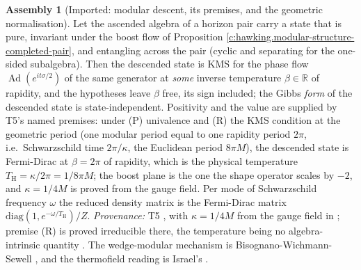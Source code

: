 \documentclass[11pt]{article}
\theoremstyle{definition}
\newtheorem{assembled}[theorem]{Assembly}
\theoremstyle{plain}
\newcommand{\changedmark}[2]{\marginpar{\raggedright\scriptsize\color{#1}#2}}
\providecommand{\R}{}\renewcommand{\R}{\mathbb{R}}
\providecommand{\TH}{}\renewcommand{\TH}{T_{\mathrm{H}}}
\begin{document}
\begin{assembled}[Imported: modular descent, its premises, and the geometric normalisation]\label{c:hawking.imported-modular-descent-premises-geometric-normalisation}
\changedmark{BurntOrange}{changed since the deposit}
Let the ascended algebra of a horizon pair carry a state that is pure, invariant under the boost flow of Proposition \ref{c:hawking.modular-structure-completed-pair}, and entangling across the pair (cyclic and separating for the one-sided subalgebra). Then the descended state is KMS for the phase flow $\operatorname{Ad}(e^{it\sigma/2})$ of the same generator at \emph{some} inverse temperature $\beta \in \R$ of rapidity, and the hypotheses leave $\beta$ free, its sign included; the Gibbs \emph{form} of the descended state is state-independent. Positivity and the value are supplied by T5's named premises: under (P) univalence and (R) the KMS condition at the geometric period (one modular period equal to one rapidity period $2\pi$, i.e.\ Schwarzschild time $2\pi/\kappa$, the Euclidean period $8\pi M$), the descended state is Fermi-Dirac at $\beta = 2\pi$ of rapidity, which is the physical temperature $\TH = \kappa/2\pi = 1/8\pi M$; the boost plane is the one the shape operator scales by $-2$, and $\kappa = 1/4M$ is proved from the gauge field. Per mode of Schwarzschild frequency $\omega$ the reduced density matrix is the Fermi-Dirac matrix $\mathrm{diag}(1, e^{-\omega/\TH})/Z$. \emph{Provenance:} T5 \cite[Thms.~7.3 and 7.6, Prems.~7.8 and 7.19, Prop.~7.18, Thm.~7.20, Cor.~6.4]{ButlerT5}, with $\kappa = 1/4M$ from the gauge field in \cite[App.~A]{ButlerT5}; premise (R) is proved irreducible there, the temperature being no algebra-intrinsic quantity \cite[Thm.~7.16]{ButlerT5}. The wedge-modular mechanism is Bisognano-Wichmann-Sewell \cite{BisognanoWichmann1976, Sewell1982}, and the thermofield reading is Israel's \cite{Israel1976}.
\end{assembled}
\end{document}
